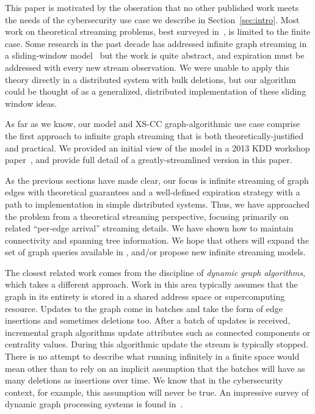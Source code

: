 This paper is motivated by the obseration that no other published work
meets the needs of the cybersecurity use case we describe in
Section~\ref{sec:intro}.  Most work on theoretical streaming problems,
best surveyed in~\cite{AMP:muthukrishnan2005data}, is limited to the finite case. Some research in the past decade has addressed 
infinite graph streaming in a sliding-window model~\cite{crouch2013dynamic,mcgregor2014graph} but the work is quite abstract, and expiration must be
addressed with every new stream observation.  We were unable to apply
this theory directly in a distributed system with bulk deletions, but our
\XSCC algorithm could be thought of as a generalized, distributed 
implementation of these sliding window ideas.

As far as we know, our \XStream model
and XS-CC graph-algorithmic use case comprise the first approach to
infinite graph streaming that is both theoretically-justified and practical.
We provided an initial view of the \XStream model in
a 2013 KDD workshop paper~\cite{AMP:berry2013maintaining}, and provide full
detail of a greatly-streamlined version in this paper. 

As the previous sections have made clear, our focus is infinite streaming of
graph edges with theoretical guarantees and a well-defined expiration 
strategy with a path to implementation in simple distributed systems.
Thus, we have approached the problem from a theoretical streaming perspective,
focusing primarily on related ``per-edge arrival'' streaming details.
We have shown how to maintain connectivity
and spanning tree information. We hope that others will expand the set
of graph queries available in \XStreamns, and/or propose new infinite
streaming models.

The closest related work comes from the discipline of \emph{dynamic graph
algorithms}, which takes a different approach.  Work in this area
typically assumes that the graph in its entirety is stored in a shared address
space or supercomputing resource.  Updates to the graph come in batches and 
take the form of edge
insertions and sometimes deletions too.  After a batch of updates is received,
incremental graph algorithms update attributes such as connected components
or centrality values.  During this algorithmic update the stream is typically
stopped.  There
is no attempt to describe what running infinitely in a finite space would mean
other than to rely on an implicit assumption that the batches will have as
many deletions as insertions over time.  We know that in the cybersecurity
context, for example, this assumption will never be true. An impressive
survey of dynamic graph processing systems is found in~\cite{besta2019practice}.

